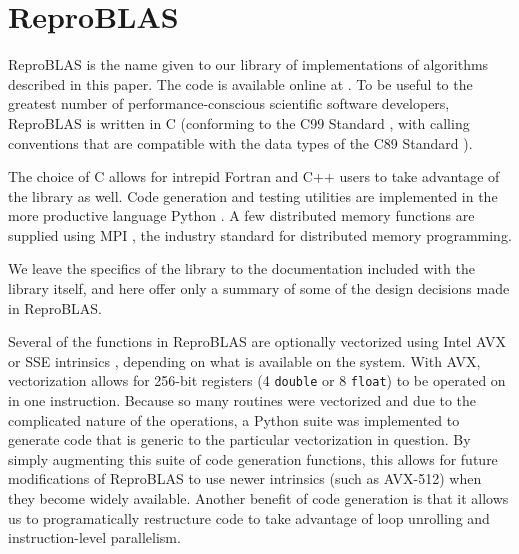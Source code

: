 \section{ReproBLAS}
  \label{sec:reproBLAS}
  ReproBLAS is the name given to our library of implementations of algorithms described in this paper.
  The code is available online at .
  To be useful to the greatest number of performance-conscious scientific software developers, ReproBLAS is written in C (conforming to the C99 Standard \cite{c99}, with calling conventions that are compatible with the data types of the C89 Standard \cite{c89}).
\begin{comment}
 complex types \cite{c89} as discussed in \cite{cblasinterface}
Because the C89 standard did not standardize the complex floating point type, all interfaces refer to complex types using \texttt{void*} pointers. If a function would normally return a complex type, a \texttt{void*} pointer is added as the last argument and the function name is suffixed by \texttt{_sub}
\end{comment}
  The choice of C allows for intrepid Fortran and C++ users to take advantage of the library as well.
  Code generation and testing utilities are implemented in the more productive language Python \cite{Python}.
  A few distributed memory functions are supplied using MPI \cite{MPI}, the industry standard for distributed memory programming.

  We leave the specifics of the library to the documentation included with the library itself, and here offer only a summary of some of the design decisions made in ReproBLAS.

  Several of the functions in ReproBLAS are optionally vectorized using Intel AVX or SSE intrinsics \cite{SSEAVX}, depending on what is available on the system. With AVX, vectorization allows for 256-bit registers (4 \texttt{double} or 8 \texttt{float}) to be operated on in one instruction. Because so many routines were vectorized and due to the complicated nature of the operations, a Python suite was implemented to generate code that is generic to the particular vectorization in question. By simply augmenting this suite of code generation functions, this allows for future modifications of ReproBLAS to use newer intrinsics (such as AVX-512) when they become widely available. Another benefit of code generation is that it allows us to programatically restructure code to take advantage of loop unrolling and instruction-level parallelism.

